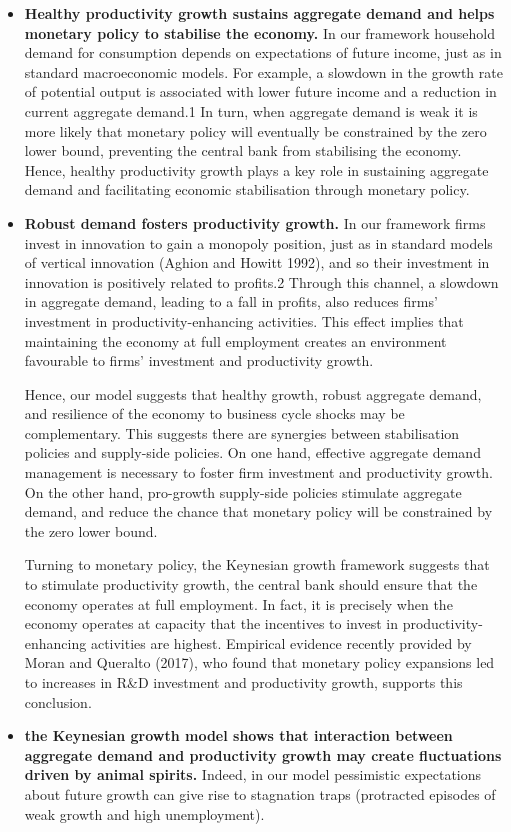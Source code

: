 \documentclass[10pt,math=newtx,citestyle=gb7714-2015,bibstyle=gb7714-2015]{elegantbook}
\begin{document}
{{{	\begin{itemize}
		\item \textbf{Healthy productivity growth sustains aggregate demand and helps monetary policy to stabilise the economy.} In our framework household demand for consumption depends on expectations of future income, just as in standard macroeconomic models. For example, a slowdown in the growth rate of potential output is associated with lower future income and a reduction in current aggregate demand.1 In turn, when aggregate demand is weak it is more likely that monetary policy will eventually be constrained by the zero lower bound, preventing the central bank from stabilising the economy. Hence, healthy productivity growth plays a key role in sustaining aggregate demand and facilitating economic stabilisation through monetary policy.
		\item \textbf{Robust demand fosters productivity growth.} In our framework firms invest in innovation to gain a monopoly position, just as in standard models of vertical innovation (Aghion and Howitt 1992), and so their investment in innovation is positively related to profits.2 Through this channel, a slowdown in aggregate demand, leading to a fall in profits, also reduces firms’ investment in productivity-enhancing activities. This effect implies that maintaining the economy at full employment creates an environment favourable to firms’ investment and productivity growth. 
		
		Hence, our model suggests that healthy growth, robust aggregate demand, and resilience of the economy to business cycle shocks may be complementary. This suggests there are synergies between stabilisation policies and supply-side policies. On one hand, effective aggregate demand management is necessary to foster firm investment and productivity growth. On the other hand, pro-growth supply-side policies stimulate aggregate demand, and reduce the chance that monetary policy will be constrained by the zero lower bound.
		
		Turning to monetary policy, the Keynesian growth framework suggests that to stimulate productivity growth, the central bank should ensure that the economy operates at full employment. In fact, it is precisely when the economy operates at capacity that the incentives to invest in productivity-enhancing activities are highest. Empirical evidence recently provided by Moran and Queralto (2017), who found that monetary policy expansions led to increases in R\&D investment and productivity growth, supports this conclusion.
		\item \textbf{the Keynesian growth model shows that interaction between aggregate demand and productivity growth may create fluctuations driven by animal spirits.} Indeed, in our model pessimistic expectations about future growth can give rise to stagnation traps (protracted episodes of weak growth and high unemployment).
		

\end{itemize}}}}
\end{document}

